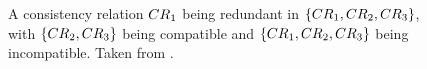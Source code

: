 \begin{figure}
    \centering
    
    \caption[Incompatibility with redundant consistency relation]{A consistency relation $\consistencyrelation{CR}{1}$ being redundant in  $\setted{\consistencyrelation{CR}{1}, \consistencyrelation{CR}{2}, \consistencyrelation{CR}{3}}$, with $\setted{\consistencyrelation{CR}{2}, \consistencyrelation{CR}{3}}$ being compatible and $\setted{\consistencyrelation{CR}{1}, \consistencyrelation{CR}{2},\consistencyrelation{CR}{3}}$ being incompatible. Taken from .}
    \label{fig:compatibility:redundancy_compatibility_counterexample}
\end{figure}

